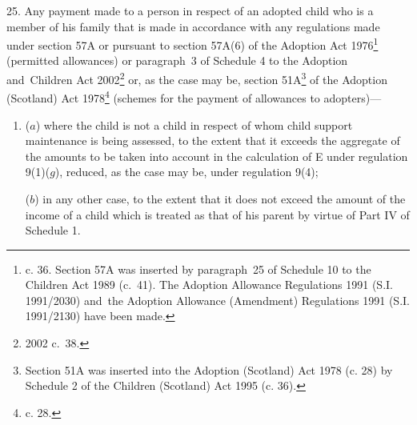 \documentclass[12pt,a4paper]{article}
\begin{document}
\medskip

25.  Any payment made to a person in respect of an adopted child who is a member of his family that is made in accordance with any regulations made under section 57A or pursuant to section 57A(6) of the Adoption Act 1976\footnote{ c. 36. Section 57A was inserted by paragraph~25 of Schedule 10 to the Children Act 1989 (c.~41). The Adoption Allowance Regulations 1991 (S.I. 1991/2030) and~the Adoption Allowance (Amendment) Regulations 1991 (S.I. 1991/2130) have been made.} (permitted allowances) 
or paragraph~3 of Schedule 4 to the Adoption and~Children Act 2002\footnote{2002 c.\ 38.}  %
or, as the case may be, 
section 51A\footnote{\frenchspacing Section 51A was inserted into the Adoption (Scotland) Act 1978 (c. 28) by Schedule 2 of the Children (Scotland) Act 1995 (c. 36).}  %
of the Adoption (Scotland) Act 1978\footnote{ c. 28.} (schemes for the payment of allowances to adopters)—
\begin{enumerate}\item[]
($a$) where the child is not a child in respect of whom child support maintenance is being assessed, to the extent that it exceeds 
the aggregate of the amounts to be taken into account in the calculation of E under regulation 9(1)($g$), %
reduced, as the case may be, under regulation 9(4);

($b$) in any other case, to the extent that it does not exceed the amount of the income of a child which is treated as that of his parent by virtue of Part IV
of Schedule 1.  %
\end{enumerate}

\end{document}
